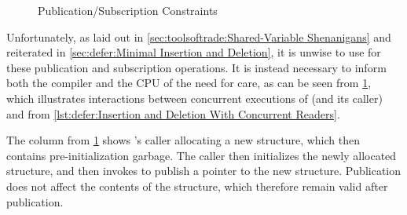 \begin{figure}
\centering
{}
\caption{Publication/Subscription Constraints}
\label{fig:defer:Publication/Subscription Constraints}
\end{figure}

Unfortunately, as laid out in
\cref{sec:toolsoftrade:Shared-Variable Shenanigans}
and reiterated in
\cref{sec:defer:Minimal Insertion and Deletion},
it is unwise to use  for these publication and subscription
operations.
It is instead necessary to inform both the compiler and the CPU
of the need for care, as can be seen from
\cref{fig:defer:Publication/Subscription Constraints},
which illustrates interactions between concurrent executions of
 (and its caller) and  from
\cref{lst:defer:Insertion and Deletion With Concurrent Readers}.

The  column from
\cref{fig:defer:Publication/Subscription Constraints}
shows 's caller allocating a new  structure,
which then contains pre-initialization garbage.
The caller then initializes the newly allocated structure, and then
invokes  to publish a pointer to the new 
structure.
Publication does not affect the contents of the structure, which
therefore remain valid after publication.

